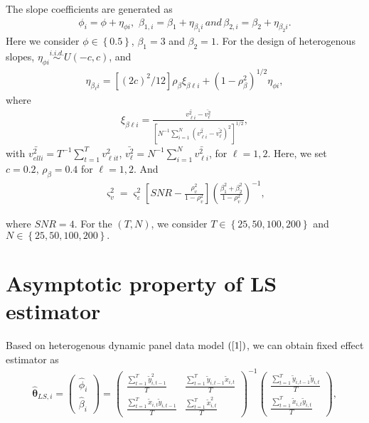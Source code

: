 \documentclass[12pt,a4paper,hyperref]{article}
\begin{document}
The slope coefficients are generated as
\begin{align}
\phi_{i}=\phi+\eta_{\phi i},\,\, \beta_{1,i}=\beta_{1}+\eta_{\beta_{1} i}\, and\, \beta_{2,i}=\beta_{2}+\eta_{\beta_{2}i}.
\end{align}
Here we consider $\phi \in \left\{0.5\right\}$, $\beta_{1}=3$ and $\beta_{2}=1$. For the design of heterogenous slopes, $\eta_{\phi i} \overset{i.i.d.}{\sim} U\left( -c, c\right)$, and
\begin{align}
\eta_{\beta_{\ell}i}=\left[(2c)^{2}/12 \right]\rho_{\beta}\xi_{\beta \ell i}+ \left(1-\rho^{2}_{\beta}  \right)^{1/2}\eta_{\phi i},
\end{align}
where
\begin{align}
\xi_{\beta \ell i}=\frac{\bar{v^{2}_{\ell i}}- \bar{v^{2}_{\ell}}}{\left[ N^{-1}\sum^{N}_{i=1} \left( \bar{v^{2}_{\ell i}}- \bar{v^{2}_{\ell }}\right)^{2} \right]^{1/2} },
\end{align}
with $\bar{v^{2}_{ell i}}=T^{-1}\sum^{T}_{t=1}v^{2}_{\ell i t}$, $\bar{v^{2}_{\ell}}=N^{-1} \sum^{N}_{i=1} \bar{v^{2}_{\ell i}}$, for $\ell=1,2.$
Here, we set $c=0.2,\, \rho_{\beta}=0.4$ for $\ell=1,2.$ And
\begin{align}
\varsigma^{2}_{v}=\varsigma^{2}_{\varepsilon}\left[SNR-\frac{\rho^{2}_{v}}{1-\rho^{2}_{v}}   \right]\left(\frac{\beta^{2}_{1}+\beta^{2}_{2}}{1-\rho^{2}_{v}}  \right)^{-1},
\end{align}

where $SNR=4$. For the $(T,N)$, we consider $T \in \left\{25, 50, 100, 200  \right\}$ and  $N \in \left\{25, 50, 100, 200  \right\}.$






\newpage
\appendix
\appendixpage
\section{Asymptotic property of LS estimator}


Based on heterogenous dynamic panel data model $(\ref{1})$, we can obtain fixed effect estimator as
\begin{align}
\hat{\boldsymbol{\theta}}_{LS,i}=
\begin{pmatrix}
\hat{\phi}_{i} \\
\hat{\beta}_{i}
\end{pmatrix}=
\begin{pmatrix}
\frac{\sum^{T}_{t=1}\tilde{y}^{2}_{i,t-1}}{T} & \frac{\sum^{T}_{t=1}\tilde{y}_{i,t-1}\tilde{x}_{i,t}}{T} \\
\frac{\sum^{T}_{t=1}\tilde{x}_{i,t}\tilde{y}_{i,t-1}}{T} &  \frac{\sum^{T}_{t=1}\tilde{x}_{i,t}^{2}}{T}
\end{pmatrix}^{-1}
\begin{pmatrix}
\frac{\sum^{T}_{t=1}\tilde{y}_{i,t-1}\tilde{y}_{i,t}}{T} \\
\frac{\sum^{T}_{t=1}\tilde{x}_{i,t}\tilde{y}_{i,t}}{T}
\end{pmatrix},
\end{align}
\end{document}

